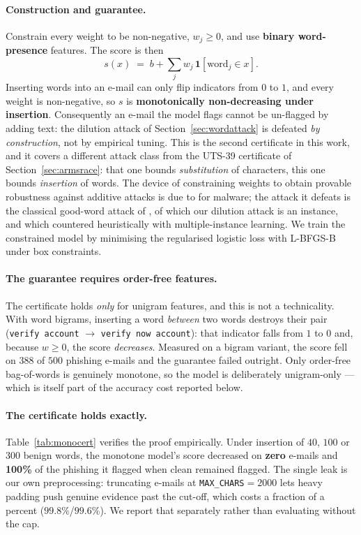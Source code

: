 \documentclass[11pt]{article}
\begin{document}
\paragraph{Construction and guarantee.} Constrain every weight to be non-negative, $w_j \ge 0$, and use
\textbf{binary word-presence} features. The score is then
\[
  s(x) \;=\; b + \sum_j w_j \, \mathbf{1}[\text{word}_j \in x].
\]
Inserting words into an e-mail can only flip indicators from $0$ to $1$, and every weight is
non-negative, so $s$ is \textbf{monotonically non-decreasing under insertion}. Consequently an e-mail
the model flags cannot be un-flagged by adding text: the dilution attack of
Section~\ref{sec:wordattack} is defeated \emph{by construction}, not by empirical tuning. This is the
second certificate in this work, and it covers a different attack class from the UTS-39 certificate of
Section~\ref{sec:armsrace}: that one bounds \emph{substitution} of characters, this one bounds
\emph{insertion} of words. The device of constraining weights to obtain provable robustness against
additive attacks is due to \citet{fleshman2018nonnegative} for malware; the attack it defeats is the
classical good-word attack of \citet{lowd2005good}, of which our dilution attack is an instance, and
which \citet{jorgensen2008multiple} countered heuristically with multiple-instance learning. We train
the constrained model by minimising the regularised logistic loss with L-BFGS-B under box constraints.

\paragraph{The guarantee requires order-free features.} The certificate holds \emph{only} for unigram
features, and this is not a technicality. With word bigrams, inserting a word \emph{between} two words
destroys their pair (\texttt{verify account} $\rightarrow$ \texttt{verify now account}): that indicator
falls from $1$ to $0$ and, because $w \ge 0$, the score \emph{decreases}. Measured on a bigram variant,
the score fell on $388$ of $500$ phishing e-mails and the guarantee failed outright. Only order-free
bag-of-words is genuinely monotone, so the model is deliberately unigram-only --- which is itself part
of the accuracy cost reported below.

\paragraph{The certificate holds exactly.} Table~\ref{tab:monocert} verifies the proof empirically.
Under insertion of $40$, $100$ or $300$ benign words, the monotone model's score decreased on
\textbf{zero} e-mails and \textbf{100\%} of the phishing it flagged when clean remained flagged. The
single leak is our own preprocessing: truncating e-mails at \texttt{MAX\_CHARS}$=2000$ lets heavy
padding push genuine evidence past the cut-off, which costs a fraction of a percent
($99.8\%$/$99.6\%$). We report that separately rather than evaluating without the cap.
\end{document}
